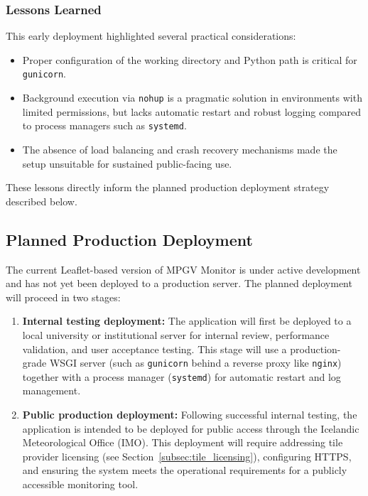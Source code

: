 \documentclass[12pt]{article}
\begin{document}
\subsubsection{Lessons Learned}
This early deployment highlighted several practical considerations:

\begin{itemize}
    \item Proper configuration of the working directory and Python path is critical for \texttt{gunicorn}.
    \item Background execution via \texttt{nohup} is a pragmatic solution in environments with limited permissions, but lacks automatic restart and robust logging compared to process managers such as \texttt{systemd}.
    \item The absence of load balancing and crash recovery mechanisms made the setup unsuitable for sustained public-facing use.
\end{itemize}

These lessons directly inform the planned production deployment strategy described below.

\subsection{Planned Production Deployment}

The current Leaflet-based version of MPGV Monitor is under active development and has not yet been deployed to a production server. The planned deployment will proceed in two stages:

\begin{enumerate}
    \item \textbf{Internal testing deployment:} The application will first be deployed to a local university or institutional server for internal review, performance validation, and user acceptance testing. This stage will use a production-grade WSGI server (such as \texttt{gunicorn} behind a reverse proxy like \texttt{nginx}) together with a process manager (\texttt{systemd}) for automatic restart and log management.
    \item \textbf{Public production deployment:} Following successful internal testing, the application is intended to be deployed for public access through the Icelandic Meteorological Office (IMO). This deployment will require addressing tile provider licensing (see Section~\ref{subsec:tile_licensing}), configuring HTTPS, and ensuring the system meets the operational requirements for a publicly accessible monitoring tool.
\end{enumerate}
\end{document}
